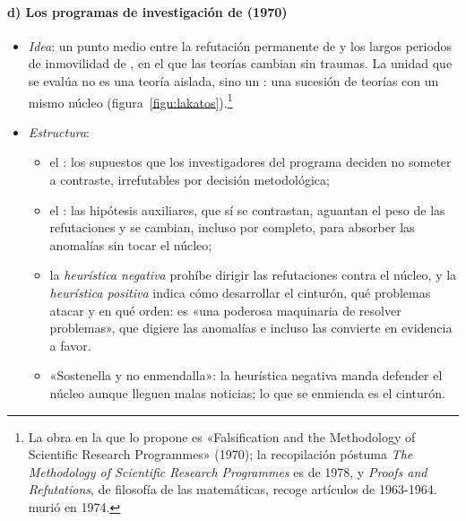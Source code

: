 \documentclass[11pt]{article}
\begin{document}
\paragraph{d) Los programas de investigación de  (1970)}

\begin{itemize}
\item \emph{Idea}: un punto medio entre la refutación permanente de  y los largos periodos de inmovilidad de , en el que las teorías cambian sin traumas. La unidad que se evalúa no es una teoría aislada, sino un : una sucesión de teorías con un mismo núcleo\nocite{Lakatos1970Falsification} (figura~\ref{figu:lakatos}).\footnote{La obra en la que lo propone es «Falsification and the Methodology of Scientific Research Programmes» (1970); la recopilación póstuma \emph{The Methodology of Scientific Research Programmes} es de 1978\nocite{Lakatos1978Methodology}, y \emph{Proofs and Refutations}\nocite{Lakatos1976Proofs}, de filosofía de las matemáticas, recoge artículos de 1963-1964.  murió en 1974.}
\item \emph{Estructura}:
  \begin{itemize}
  \item el : los supuestos que los investigadores del programa deciden no someter a contraste, irrefutables por decisión metodológica;
  \item el : las hipótesis auxiliares, que sí se contrastan, aguantan el peso de las refutaciones y se cambian, incluso por completo, para absorber las anomalías sin tocar el núcleo;
  \item la \emph{heurística negativa} prohíbe dirigir las refutaciones contra el núcleo, y la \emph{heurística positiva} indica cómo desarrollar el cinturón, qué problemas atacar y en qué orden: es «una poderosa maquinaria de resolver problemas», que digiere las anomalías e incluso las convierte en evidencia a favor\nocite{Lakatos1978Methodology}.
  \end{itemize}
  \begin{itemize}
  \item «Sostenella y no enmendalla»: la heurística negativa manda defender el núcleo aunque lleguen malas noticias; lo que se enmienda es el cinturón.
  \end{itemize}
\end{itemize}

\begin{infografia}[H]
\centering
\caption{El programa de investigación de : núcleo firme y cinturón protector}\label{figu:lakatos}
\end{infografia}
\end{document}
